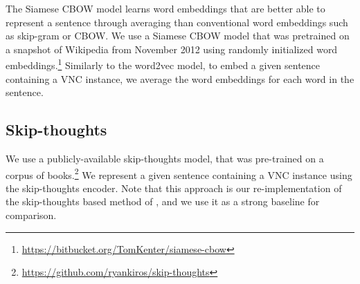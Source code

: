 \documentclass[11pt,a4paper]{article}
\begin{document}

The Siamese CBOW model \cite{kenter-borisov-derijke} learns word
embeddings that are better able to represent a sentence through
averaging than conventional word embeddings such as skip-gram or
CBOW. We use a Siamese CBOW model that was pretrained on a snapshot of
Wikipedia from November 2012 using randomly initialized word
embeddings.\footnote{\url{https://bitbucket.org/TomKenter/siamese-cbow}}
Similarly to the word2vec model, to embed a given sentence containing
a VNC instance, we average the word embeddings for each word in the
sentence.






\subsection{Skip-thoughts}
%


We use a publicly-available skip-thoughts model, that was pre-trained
on a corpus of
books.\footnote{\url{https://github.com/ryankiros/skip-thoughts}} We
represent a given sentence containing a VNC instance using the
skip-thoughts encoder.
Note that this approach is our re-implementation of the skip-thoughts
based method of , and we use it as a
strong baseline for comparison.
\end{document}
